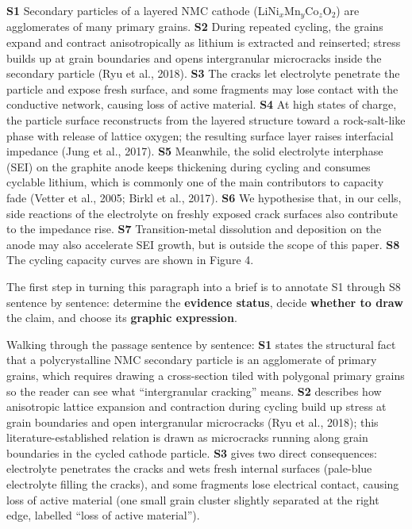 \begin{BookNote}
\textbf{S1} Secondary particles of a layered NMC cathode (LiNi$_x$Mn$_y$Co$_z$O$_2$) are agglomerates of many primary grains. \textbf{S2} During repeated cycling, the grains expand and contract anisotropically as lithium is extracted and reinserted; stress builds up at grain boundaries and opens intergranular microcracks inside the secondary particle (Ryu et al., 2018). \textbf{S3} The cracks let electrolyte penetrate the particle and expose fresh surface, and some fragments may lose contact with the conductive network, causing loss of active material. \textbf{S4} At high states of charge, the particle surface reconstructs from the layered structure toward a rock-salt-like phase with release of lattice oxygen; the resulting surface layer raises interfacial impedance (Jung et al., 2017). \textbf{S5} Meanwhile, the solid electrolyte interphase (SEI) on the graphite anode keeps thickening during cycling and consumes cyclable lithium, which is commonly one of the main contributors to capacity fade (Vetter et al., 2005; Birkl et al., 2017). \textbf{S6} We hypothesise that, in our cells, side reactions of the electrolyte on freshly exposed crack surfaces also contribute to the impedance rise. \textbf{S7} Transition-metal dissolution and deposition on the anode may also accelerate SEI growth, but is outside the scope of this paper. \textbf{S8} The cycling capacity curves are shown in Figure 4.
\end{BookNote}

The first step in turning this paragraph into a brief is to annotate S1 through S8 sentence by sentence: determine the \textbf{evidence status}, decide \textbf{whether to draw} the claim, and choose its \textbf{graphic expression}.

Walking through the passage sentence by sentence: \textbf{S1} states the structural fact that a polycrystalline NMC secondary particle is an agglomerate of primary grains, which requires drawing a cross-section tiled with polygonal primary grains so the reader can see what ``intergranular cracking'' means. \textbf{S2} describes how anisotropic lattice expansion and contraction during cycling build up stress at grain boundaries and open intergranular microcracks (Ryu et al., 2018); this literature-established relation is drawn as microcracks running along grain boundaries in the cycled cathode particle. \textbf{S3} gives two direct consequences: electrolyte penetrates the cracks and wets fresh internal surfaces (pale-blue electrolyte filling the cracks), and some fragments lose electrical contact, causing loss of active material (one small grain cluster slightly separated at the right edge, labelled ``loss of active material'').


